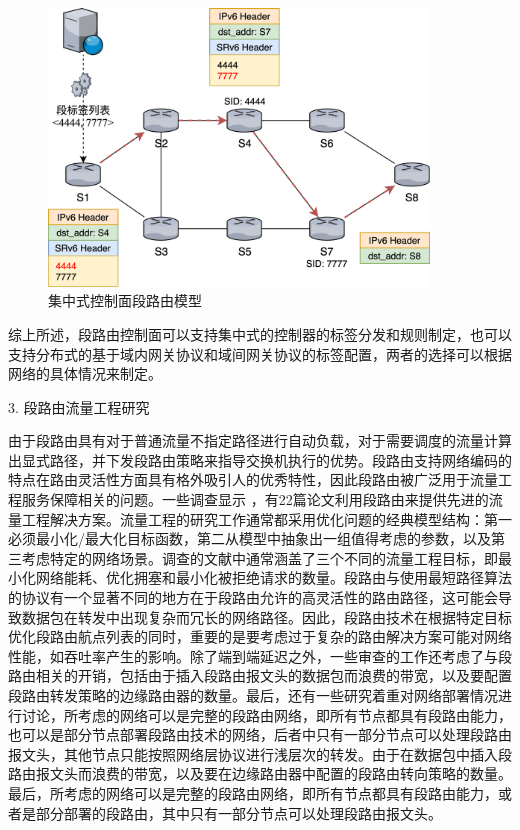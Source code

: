 \begin{figure}[htbp]
\setlength{\abovecaptionskip}{15pt plus 3pt minus 2pt}
\centerline{\includegraphics[width=0.9\textwidth]{./figures/ch2-sr-model.png}}
\caption{集中式控制面段路由模型}
\label{fig-ch2-sr-model}
\end{figure}
    
综上所述，段路由控制面可以支持集中式的控制器的标签分发和规则制定，也可以支持分布式的基于域内网关协议和域间网关协议的标签配置，两者的选择可以根据网络的具体情况来制定。

3. 段路由流量工程研究

由于段路由具有对于普通流量不指定路径进行自动负载，对于需要调度的流量计算出显式路径，并下发段路由策略来指导交换机执行的优势。段路由支持网络编码的特点在路由灵活性方面具有格外吸引人的优秀特性，因此段路由被广泛用于流量工程服务保障相关的问题。一些调查显示 \cite{SRSURVEYS} ，有22篇论文利用段路由来提供先进的流量工程解决方案。流量工程的研究工作通常都采用优化问题的经典模型结构：第一必须最小化/最大化目标函数，第二从模型中抽象出一组值得考虑的参数，以及第三考虑特定的网络场景。调查的文献中通常涵盖了三个不同的流量工程目标，即最小化网络能耗、优化拥塞和最小化被拒绝请求的数量。段路由与使用最短路径算法的协议有一个显著不同的地方在于段路由允许的高灵活性的路由路径，这可能会导致数据包在转发中出现复杂而冗长的网络路径。因此，段路由技术在根据特定目标优化段路由航点列表的同时，重要的是要考虑过于复杂的路由解决方案可能对网络性能，如吞吐率产生的影响。除了端到端延迟之外，一些审查的工作还考虑了与段路由相关的开销，包括由于插入段路由报文头的数据包而浪费的带宽，以及要配置段路由转发策略的边缘路由器的数量。最后，还有一些研究着重对网络部署情况进行讨论，所考虑的网络可以是完整的段路由网络，即所有节点都具有段路由能力，也可以是部分节点部署段路由技术的网络，后者中只有一部分节点可以处理段路由报文头，其他节点只能按照网络层协议进行浅层次的转发。由于在数据包中插入段路由报文头而浪费的带宽，以及要在边缘路由器中配置的段路由转向策略的数量。最后，所考虑的网络可以是完整的段路由网络，即所有节点都具有段路由能力，或者是部分部署的段路由，其中只有一部分节点可以处理段路由报文头。

